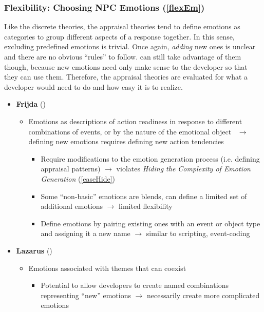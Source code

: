 \subsubsection{Flexibility: Choosing NPC Emotions (\ref{flexEm})}
Like the discrete theories, the appraisal theories tend to define emotions as
categories to group different aspects of a response together. In this sense,
excluding predefined emotions is trivial. Once again, \textit{adding} new ones
is unclear and there are no obvious ``rules'' to follow. \progname{} can still
take advantage of them though, because new emotions need only make sense to the
developer so that they can use them. Therefore, the appraisal theories are
evaluated for what a developer would need to do and how easy it is to realize.

\begin{itemize}
    \item \textbf{Frijda} (\weak)
    \begin{itemize}
        \item Emotions as descriptions of action readiness in response to
        different combinations of events, or by the nature of the emotional
        object~\cite[p.~72--74]{frijda1986emotions} $\rightarrow$ defining new
        emotions requires defining new action tendencies
        \begin{itemize}
            \item Require modifications to the emotion generation process (i.e.
            defining appraisal patterns) $\rightarrow$ violates \textit{Hiding
                the Complexity of Emotion Generation} (\ref{easeHide})

            \item Some ``non-basic'' emotions are blends, can define a limited
            set of additional emotions $\rightarrow$ limited flexibility

            \item Define emotions by pairing existing ones with an event or
            object type and assigning it a new name $\rightarrow$ similar to
            scripting, event-coding
        \end{itemize}
    \end{itemize}

    \item \textbf{Lazarus} (\weak)
    \begin{itemize}
        \item Emotions associated with themes that can
        coexist~\citep[p.~229]{lazarus1991emotion}
        \begin{itemize}
            \item Potential to allow developers to create named combinations
            representing ``new'' emotions $\rightarrow$ necessarily create more
            complicated emotions


\end{itemize}
\end{itemize}
\end{itemize}
